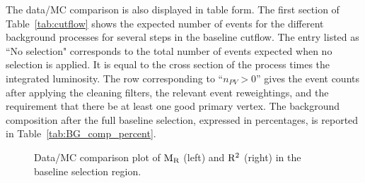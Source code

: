 The data/MC comparison is also displayed in table form. The first section of Table~\ref{tab:cutflow}
shows the expected number of events for the different background processes for several steps in the
baseline cutflow. The entry listed as ``No selection" corresponds to the total number of events
expected when no selection is applied. It is equal to the cross section of the process times the
integrated luminosity. 
The row corresponding to ``$n_{PV} > 0$'' gives the event counts after applying the
cleaning filters, the relevant event reweightings, and the requirement that there be at least one
good primary vertex.
The background composition after the full baseline selection, expressed in percentages, is reported
in Table~\ref{tab:BG_comp_percent}.  

\begin{figure}[htbp]
 \centering
 \caption{Data/MC comparison plot of $\mathrm{M_R}$ (left) and $\mathrm{R^2}$ (right) in the baseline selection
region.
 \label{fig:boost_baseline_dataMC}}
\end{figure}
